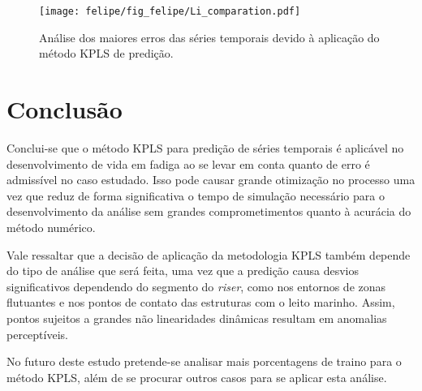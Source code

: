 \begin{figure}[!ht]
    \centering
    \texttt{[image: felipe/fig\_felipe/Li\_comparation.pdf]} 
    \caption{Análise dos maiores erros das séries temporais devido à aplicação do método KPLS de predição.}
    \label{Li_comparation}
\end{figure}


\section{Conclusão}

Conclui-se que o método KPLS para predição de séries temporais é aplicável no desenvolvimento de vida em fadiga ao se levar em conta quanto de erro é admissível no caso estudado. Isso pode causar grande otimização no processo uma vez que reduz de forma significativa o tempo de simulação necessário para o desenvolvimento da análise sem grandes comprometimentos quanto à acurácia do método numérico. 

Vale ressaltar que a decisão de aplicação da metodologia KPLS também depende do tipo de análise que será feita, uma vez que a predição causa desvios significativos dependendo do segmento do \emph{riser}, como nos entornos de zonas flutuantes e nos pontos de contato das estruturas com o leito marinho. Assim, pontos sujeitos a grandes não linearidades dinâmicas resultam em anomalias perceptíveis. 

No futuro deste estudo pretende-se analisar mais porcentagens de traino para o método KPLS, além de se procurar outros casos para se aplicar esta análise.
